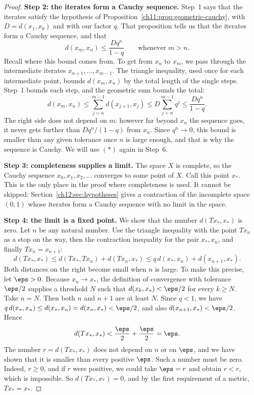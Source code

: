 \begin{proof}
\textbf{Step 2: the iterates form a Cauchy sequence.} Step~1 says that the iterates satisfy the hypothesis of Proposition~\ref{ch11:prop:geometric-cauchy}, with $D=d(x_1,x_0)$ and with our factor $q$. That proposition tells us that the iterates form a Cauchy sequence, and that
\begin{equation*}
d(x_m,x_n)\le\frac{Dq^n}{1-q}\qquad\text{whenever }m>n.
\tag{$*$}
\end{equation*}
Recall where this bound comes from. To get from $x_n$ to $x_m$, we pass through the intermediate iterates $x_{n+1},\ldots,x_{m-1}$. The triangle inequality, used once for each intermediate point, bounds $d(x_m,x_n)$ by the total length of the single steps. Step~1 bounds each step, and the geometric sum bounds the total:
\[
d(x_m,x_n)\le\sum_{j=n}^{m-1}d(x_{j+1},x_j)
\le D\sum_{j=n}^{m-1}q^j
\le\frac{Dq^n}{1-q}.
\]
The right side does not depend on $m$: however far beyond $x_n$ the sequence goes, it never gets further than $Dq^n/(1-q)$ from $x_n$. Since $q^n\to0$, this bound is smaller than any given tolerance once $n$ is large enough, and that is why the sequence is Cauchy. We will use $(*)$ again in Step~6.

\textbf{Step 3: completeness supplies a limit.} The space $X$ is complete, so the Cauchy sequence $x_0,x_1,x_2,\ldots$ converges to some point of $X$. Call this point $x_*$. This is the only place in the proof where completeness is used. It cannot be skipped: Section~\ref{ch12:sec:hypotheses} gives a contraction of the incomplete space $(0,1)$ whose iterates form a Cauchy sequence with no limit in the space.

\textbf{Step 4: the limit is a fixed point.} We show that the number $d(Tx_*,x_*)$ is zero. Let $n$ be any natural number. Use the triangle inequality with the point $Tx_n$ as a stop on the way, then the contraction inequality for the pair $x_*,x_n$, and finally $Tx_n=x_{n+1}$:
\[
d(Tx_*,x_*)\le d(Tx_*,Tx_n)+d(Tx_n,x_*)
\le q\,d(x_*,x_n)+d(x_{n+1},x_*).
\]
Both distances on the right become small when $n$ is large. To make this precise, let $\eps>0$. Because $x_n\to x_*$, the definition of convergence with tolerance $\eps/2$ supplies a threshold $N$ such that $d(x_k,x_*)<\eps/2$ for every $k\ge N$. Take $n=N$. Then both $n$ and $n+1$ are at least $N$. Since $q<1$, we have $q\,d(x_*,x_n)\le d(x_*,x_n)=d(x_n,x_*)<\eps/2$, and also $d(x_{n+1},x_*)<\eps/2$. Hence
\[
d(Tx_*,x_*)<\frac\eps2+\frac\eps2=\eps.
\]
The number $r=d(Tx_*,x_*)$ does not depend on $n$ or on $\eps$, and we have shown that it is smaller than every positive $\eps$. Such a number must be zero. Indeed, $r\ge0$, and if $r$ were positive, we could take $\eps=r$ and obtain $r<r$, which is impossible. So $d(Tx_*,x_*)=0$, and by the first requirement of a metric, $Tx_*=x_*$.


\end{proof}
